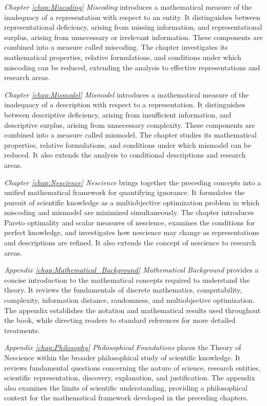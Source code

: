 \emph{Chapter \ref{chap:Miscoding} Miscoding} introduces a mathematical measure of the inadequacy of a representation with respect to an entity. It distinguishes between representational deficiency, arising from missing information, and representational surplus, arising from unnecessary or irrelevant information. These components are combined into a measure called miscoding. The chapter investigates its mathematical properties, relative formulations, and conditions under which miscoding can be reduced, extending the analysis to effective representations and research areas.

\emph{Chapter \ref{chap:Mismodel} Mismodel} introduces a mathematical measure of the inadequacy of a description with respect to a representation. It distinguishes between descriptive deficiency, arising from insufficient information, and descriptive surplus, arising from unnecessary complexity. These components are combined into a measure called mismodel. The chapter studies its mathematical properties, relative formulations, and conditions under which mismodel can be reduced. It also extends the analysis to conditional descriptions and research areas.

\emph{Chapter \ref{chap:Nescience} Nescience} brings together the preceding concepts into a unified mathematical framework for quantifying ignorance. It formulates the pursuit of scientific knowledge as a multiobjective optimization problem in which miscoding and mismodel are minimized simultaneously. The chapter introduces Pareto optimality and scalar measures of nescience, examines the conditions for perfect knowledge, and investigates how nescience may change as representations and descriptions are refined. It also extends the concept of nescience to research areas.

\emph{Appendix \ref{chap:Mathematical_Background} Mathematical Background} provides a concise introduction to the mathematical concepts required to understand the theory. It reviews the fundamentals of discrete mathematics, computability, complexity, information distance, randomness, and multiobjective optimization. The appendix establishes the notation and mathematical results used throughout the book, while directing readers to standard references for more detailed treatments.

\emph{Appendix \ref{chap:Philosophy} Philosophical Foundations} places the Theory of Nescience within the broader philosophical study of scientific knowledge. It reviews fundamental questions concerning the nature of science, research entities, scientific representation, discovery, explanation, and justification. The appendix also examines the limits of scientific understanding, providing a philosophical context for the mathematical framework developed in the preceding chapters.

